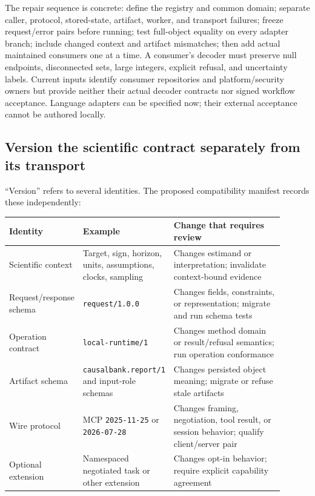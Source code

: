 The repair sequence is concrete: define the registry and common domain;
separate caller, protocol, stored-state, artifact, worker, and transport
failures; freeze request/error pairs before running; test full-object equality
on every adapter branch; include changed context and artifact mismatches;
then add actual maintained consumers one at a time. A consumer's decoder must
preserve null endpoints, disconnected sets, large integers, explicit refusal,
and uncertainty labels. Current inputs identify consumer repositories and
platform/security owners but provide neither their actual decoder contracts
nor signed workflow acceptance. Language adapters can be specified now;
their external acceptance cannot be authored locally.
\citep{exec16_parity_design,exec17_continuity_contract}

\subsection{Version the scientific contract separately from its transport}
\label{exec17:versions}

“Version” refers to several identities. The proposed compatibility manifest
records these independently:
\begin{center}
\begin{tabular}{p{0.19\linewidth}p{0.28\linewidth}p{0.43\linewidth}}
\hline
Identity & Example & Change that requires review\\
\hline
Scientific context & Target, sign, horizon, units, assumptions, clocks, sampling & Changes estimand or interpretation; invalidate context-bound evidence\\
Request/response schema & \texttt{request/1.0.0} & Changes fields, constraints, or representation; migrate and run schema tests\\
Operation contract & \texttt{local-runtime/1} & Changes method domain or result/refusal semantics; run operation conformance\\
Artifact schema & \texttt{causalbank.report/1} and input-role schemas & Changes persisted object meaning; migrate or refuse stale artifacts\\
Wire protocol & MCP \texttt{2025-11-25} or \texttt{2026-07-28} & Changes framing, negotiation, tool result, or session behavior; qualify client/server pair\\
Optional extension & Namespaced negotiated task or other extension & Changes opt-in behavior; require explicit capability agreement\\
\hline
\end{tabular}
\end{center}

